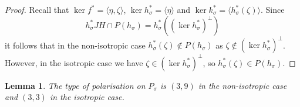 \documentclass{amsart}
\newtheorem{lem}[thm]{Lemma}
\theoremstyle{remark}
\numberwithin{equation}{section}
\newcommand{\tC}{\Tilde{C}}
\newcommand{\s}{\sigma}
\begin{document}
\begin{proof}
    Recall that $\ker f^* = \langle \eta, \zeta \rangle$, $\ker h_{\sigma}^* = \langle \eta \rangle$ and $\ker k_{\sigma}^* = \langle h_\sigma^*(\zeta) \rangle$. Since $$h_{\sigma}^*JH \cap P(h_{\sigma}) = h_{\sigma}^*((\ker h_{\sigma}^*)^{\bot})$$ it follows that in the non-isotropic case $h_{\s}^*(\zeta) \notin P(h_{\s})$ as $\zeta \notin (\ker h_{\s}^*)^{\bot}$.
    However, in the isotropic case we have $\zeta \in (\ker h_{\s}^*)^{\bot}$, so $h_{\sigma}^*(\zeta) \in P(h_{\sigma})$.
\end{proof}

\begin{lem}
\label{typeprym}
    The type of polarisation on $P_\s$ is $(3,9)$ in the non-isotropic case and $(3,3)$ in the isotropic case.
\end{lem}
\end{document}
